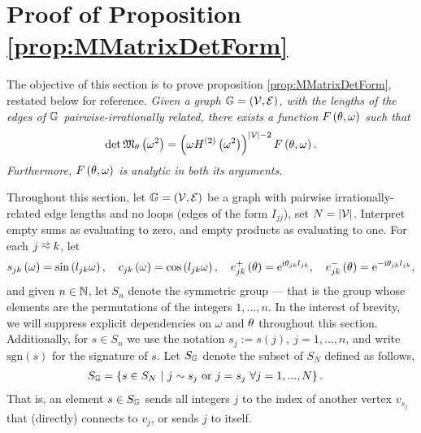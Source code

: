 \section{Proof of Proposition \ref{prop:MMatrixDetForm}} \label{sec:ProofOfProp}
The objective of this section is to prove proposition \ref{prop:MMatrixDetForm}, restated below for reference. \newline
\textit{ Given a graph $\mathbb{G} = \left( \mathcal{V}, \mathcal{E} \right)$, with the lengths of the edges of $\mathbb{G}$ pairwise-irrationally related, there exists a function $F\left( \theta,\omega \right)$ such that
\begin{align*}
	\det\mathfrak{M}_\theta\left( \omega^2 \right) = \left(  \omega H^{(2)}\left( \omega^2 \right)  \right)^{\left\lvert \mathcal{V} \right\rvert-2} F\left( \theta,\omega \right).
\end{align*}
Furthermore, $F\left( \theta,\omega \right)$ is analytic in both its arguments. } \newline

Throughout this section, let $\mathbb{G}=\left( \mathcal{V}, \mathcal{E} \right)$ be a graph with pairwise irrationally-related edge lengths and no loops (edges of the form $I_{jj}$), set $N=\left\lvert \mathcal{V} \right\rvert$.
Interpret empty sums as evaluating to zero, and empty products as evaluating to one.
For each $j\conLeft k$, let
\begin{align*}
	s_{jk}\left( \omega \right) = \sin\left( l_{jk}\omega \right), \quad
	c_{jk}\left( \omega \right) = \cos\left( l_{jk}\omega \right), \quad
	e_{jk}^+\left( \theta \right) = \mathrm{e}^{\mathrm{i}\theta_{jk}l_{jk}}, \quad
	e_{jk}^-\left( \theta \right) = \mathrm{e}^{-\mathrm{i}\theta_{jk}l_{jk}},
\end{align*}
and given $n\in\mathbb{N}$, let $S_n$ denote the symmetric group --- that is the group whose elements are the permutations of the integers $1, ..., n$.
In the interest of brevity, we will suppress explicit dependencies on $\omega$ and $\theta$ throughout this section.
Additionally, for $s\in S_n$ we use the notation $s_j := s(j), \ j=1,...,n$, and write $\mathrm{sgn}(s)$ for the signature of $s$.
Let $S_{\mathbb{G}}$ denote the subset of $S_N$ defined as follows,
\begin{align*}
	S_{\mathbb{G}} &= \left\{  s\in S_N \ \middle\vert \  j\sim s_j \text{ or } j=s_j \ \forall j=1,...,N \right\}.
\end{align*}
That is, an element $s\in S_{\mathbb{G}}$ sends all integers $j$ to the index of another vertex $v_{s_j}$ that (directly) connects to $v_j$, or sends $j$ to itself.

